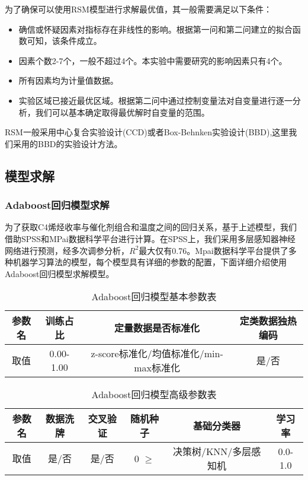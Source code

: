 \documentclass[withoutpreface,bwprint]{cumcmthesis} %
\begin{document}
为了确保可以使用RSM模型进行求解最优值，其一般需要满足以下条件：
\begin{itemize}
	\item 确信或怀疑因素对指标存在非线性的影响。根据第一问和第二问建立的拟合函数可知，该条件成立。
	\item 因素个数2-7个，一般不超过4个。本实验中需要研究的影响因素只有4个。
	\item 所有因素均为计量值数据。
	\item 实验区域已接近最优区域。根据第二问中通过控制变量法对自变量进行逐一分析，我们可以基本确定取得最优解时自变量的范围。
\end{itemize}

RSM一般采用中心复合实验设计(CCD)或者Box-Behnken实验设计(BBD),这里我们采用的BBD的实验设计方法。

\subsection{模型求解}
\subsubsection{Adaboost回归模型求解}
为了获取C4烯烃收率与催化剂组合和温度之间的回归关系，基于上述模型，我们借助SPSS和MPai数据科学平台进行计算。在SPSS上，我们采用多层感知器神经网络进行预测，经多次调参分析，$R^2$最大仅有0.76。Mpai数据科学平台提供了多种机器学习算法的模型，每个模型具有详细的参数的配置，下面详细介绍使用Adaboost回归模型求解模型。

\begin{table}[!htbp]
	\caption{Adaboost回归模型基本参数表}\label{tab:001} \centering
	\begin{tabular}{cccc}
		\toprule[1.5pt]
		 参数名& 训练占比 & 定量数据是否标准化 & 定类数据独热编码 \\
		\midrule[1pt]
		取值 &  0.00-1.00 & z-score标准化/均值标准化/min-max标准化 & 是/否 \\
		\bottomrule[1.5pt]
	\end{tabular}
\end{table}

\begin{table}[!htbp]
	\caption{Adaboost回归模型高级参数表}\label{tab:001} \centering
	\begin{tabular}{cccccc}
		\toprule[1.5pt]
		参数名& 数据洗牌 & 交叉验证 & 随机种子 & 基础分类器 & 学习率 \\
		\midrule[1pt]
		取值 &  是/否 & 是/否 &   0 $\geq$ & 决策树/KNN/多层感知机 &
		0.0-1.0 \\
		\bottomrule[1.5pt]	
	\end{tabular}
\end{table}
\end{document}
